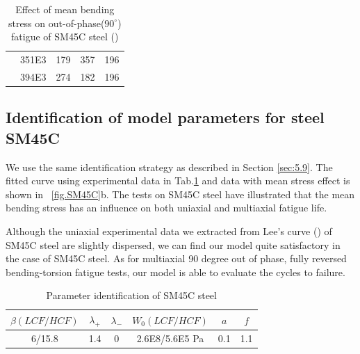 \documentclass[3p,times,procedia,number]{elsarticle}
\newcommand{\figref}[1]{\figurename~\ref{#1}}
\begin{document}
\begin{table}[!h]
\begin{tabularx}{\textwidth}{XXXXX}
		& 351E3                                                                                 & 179                                                                                       & 357                                                                                         & 196                                                                                         \\
		& 394E3                                                                                 & 274                                                                                       & 182                                                                                         & 196                                                                                         \\ \hline
	\end{tabularx}
	\caption{Effect of mean bending stress on out-of-phase($90^\circ$) fatigue of SM45C steel (\cite{lee2013out})}
	\label{meanSM45C}
\end{table}

\newpage
\subsection{Identification of model parameters for steel SM45C}

We use the same identification strategy as described in Section \ref{sec:5.9}. The fitted curve using experimental data in Tab.\ref{meanSM45C} and data with mean stress effect is shown in \figref{fig.SM45C}b.
The tests on SM45C steel have illustrated that the mean bending stress has an influence on both uniaxial and multiaxial fatigue life. 

Although the uniaxial experimental data we extracted from Lee's curve (\cite{lee2013out}) of SM45C steel are slightly dispersed, we can find our model quite satisfactory in the case of SM45C steel. As for multiaxial 90 degree out of phase, fully reversed bending-torsion fatigue tests, our model is able to evaluate the cycles to failure.

\begin{table}[!h]
	\centering
	\begin{tabular}{|c|c|c|c|c|c|}
		\hline
		\textbf{$\beta(LCF/HCF)$} & \textbf{$\lambda_+$} & \textbf{$\lambda_-$} & \textbf{$W_0(LCF/HCF)$} & \textbf{$a$}& \textbf{$f$}  \\ \hline
		6/15.8  & 1.4 &0         &2.6E8/5.6E5 Pa  & 0.1 & 1.1    \\ \hline
	\end{tabular}
	\caption{Parameter identification of SM45C steel}
	\label{sm45cpara}
\end{table}
\end{document}
